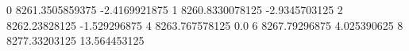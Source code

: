 0 8261.3505859375 -2.4169921875
1 8260.8330078125 -2.9345703125
2 8262.23828125 -1.529296875
4 8263.767578125 0.0
6 8267.79296875 4.025390625
8 8277.33203125 13.564453125
